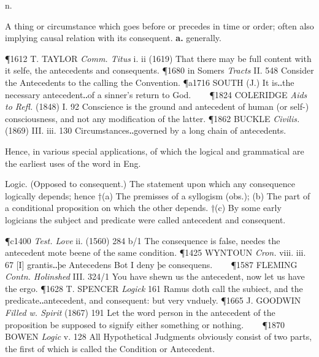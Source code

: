\begin{description}[wide, labelwidth=!, labelindent=0pt]
  n.

\noindent  {}

\vspace{-0.3cm}

\begin{myenumerate}
 A thing or circumstance which goes before or precedes in time or order;
often also implying causal relation with its consequent. \textbf{a.} generally. 

\P 1612 T. TAYLOR \textit{Comm. Titus} i. ii (1619) That there may be full content with
it selfe, the antecedents and consequents.
\P 1680 in Somers \textit{Tracts} II. 548
Consider the Antecedents to the calling the Convention.
\P a1716 SOUTH (J.) It is‥the necessary antecedent‥of a sinner's return to God.    
\P 1824 COLERIDGE \textit{Aids to Refl.} (1848) I. 92 Conscience is the ground 
and antecedent of human (or
self-) consciousness, and not any modification of the latter.
\P 1862 BUCKLE \textit{Civilis.} (1869) III. iii. 130 Circumstances‥governed by a long chain of
antecedents.

Hence, in various special applications, of which the logical and grammatical are
the earliest uses of the word in Eng. 

 Logic. (Opposed to consequent.) The statement upon which any consequence
logically depends; hence †(a) The premisses of a syllogism (obs.); (b) The part
of a conditional proposition on which the other depends. †(c) By some early
logicians the subject and predicate were called antecedent and consequent. 

\P c1400 \textit{Test. Love} ii. (1560) 284 b/1 The consequence is false, needes the
antecedent mote beene of the same condition.
\P 1425 WYNTOUN \textit{Cron.} viii. iii.
67 [I] grantis‥þe Antecedens Bot I deny þe consequens.    
\P 1587 FLEMING \textit{Contn. Holinshed} III. 324/1 You have shewn us the antecedent, now let us have the ergo.
\P 1628 T. SPENCER \textit{Logick} 161 Ramus doth call the subiect, and the
predicate‥antecedent, and consequent: but very vnduely.
\P 1665 J. GOODWIN \textit{Filled w. Spirit} (1867) 191 Let the word person in the antecedent of the
proposition be supposed to signify either something or nothing.    
\P 1870 BOWEN \textit{Logic} v. 128 All Hypothetical Judgments obviously consist of two parts, the
first of which is called the Condition or Antecedent.


\end{myenumerate}
\end{description}

